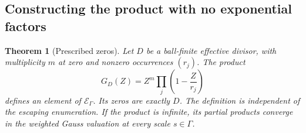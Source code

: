 \documentclass[11pt,letterpaper]{article}
\numberwithin{equation}{section}
\newtheorem{theorem}{Theorem}[section]
\theoremstyle{definition}
\theoremstyle{remark}
\begin{document}
\subsection{Constructing the product with no exponential factors}
\begin{theorem}[Prescribed zeros]\label{thm:prescribed-divisor}
Let $D$ be a ball-finite effective divisor, with multiplicity $m$ at zero and
nonzero occurrences $(r_j)$. The product
\begin{equation}\label{eq:canonical-product}
 G_D(Z)=Z^m\prod_j\left(1-\frac{Z}{r_j}\right)
\end{equation}
defines an element of $\mathcal E_\Gamma$. Its zeros are exactly $D$.
The definition is independent of the escaping enumeration. If the product is
infinite, its partial products converge in the weighted Gauss valuation at
every scale $s\in\Gamma$.
\end{theorem}
\end{document}
